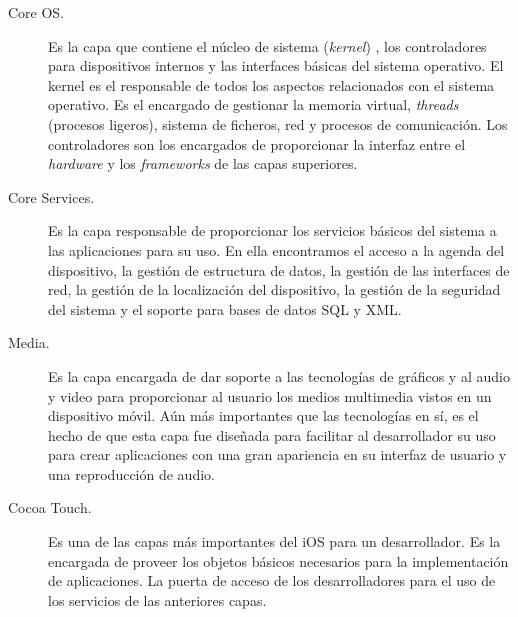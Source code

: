 
\begin{description}
\item[Core OS.]  Es la capa que contiene el núcleo de
  sistema (\emph{kernel}) %
  , los controladores para dispositivos internos y las interfaces básicas del sistema
  operativo. El kernel es el responsable de todos los aspectos
  relacionados con el sistema operativo. Es el encargado de gestionar
  la memoria virtual, \emph{threads} (procesos ligeros), sistema de ficheros,
  red y procesos de comunicación. Los controladores son los encargados
  de proporcionar la interfaz entre el \emph{hardware} y los \emph{frameworks} de
  las capas superiores.
\item[Core Services.] Es la capa responsable de proporcionar los
  servicios básicos del sistema a las aplicaciones para su uso. En
  ella encontramos el acceso a la agenda del dispositivo, la gestión
  de estructura de datos, la gestión de las interfaces de red, la
  gestión de la localización del dispositivo, la gestión de la seguridad
  del sistema y el soporte para bases de datos SQL y XML.
\item[Media.] Es la capa encargada de dar soporte a las
  tecnologías de gráficos y al audio y video para proporcionar al usuario
  los medios multimedia vistos en un dispositivo móvil.
  Aún más importantes que las tecnologías
  en sí, es el hecho de que esta capa fue diseñada para facilitar al desarrollador su uso
  para crear aplicaciones con una gran apariencia en su interfaz de
  usuario y una reproducción de audio. %
\item[Cocoa Touch.]  Es una de las capas más importantes del iOS
  para un desarrollador. %
  Es la encargada de proveer los objetos básicos necesarios para la
  implementación de aplicaciones. La puerta de acceso de los desarrolladores
  para el uso de los servicios de las anteriores capas.
\end{description}

  
